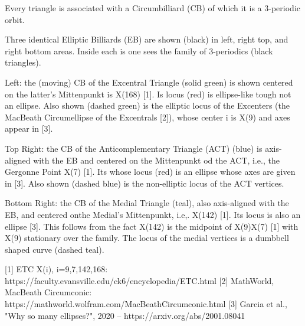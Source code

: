 Every triangle is associated with a Circumbilliard (CB) of which it is a 3-periodic orbit.

Three identical Elliptic Billiards (EB) are shown (black) in left, right top, and right bottom areas. Inside each is one sees the family of 3-periodics (black triangles).

Left: the (moving) CB of the Excentral Triangle (solid green) is shown centered on the latter's Mittenpunkt is X(168) [1]. Is locus (red) is ellipse-like tough not an ellipse. Also shown (dashed green) is the elliptic locus of the Excenters (the MacBeath Circumellipse of the Excentrals [2]), whose center i is X(9) and axes appear in [3].

Top Right: the CB of the Anticomplementary Triangle (ACT) (blue) is axis-aligned with the EB and centered on the Mittenpunkt od the ACT, i.e., the Gergonne Point X(7) [1]. Its whose locus (red) is an ellipse whose axes are given in [3]. Also shown (dashed blue) is the non-elliptic locus of the ACT vertices.

Bottom Right: the CB of the Medial Triangle (teal), also axis-aligned with the EB, and centered onthe Medial's Mittenpunkt, i.e,. X(142) [1]. Its locus is also an ellipse [3]. This follows from the fact X(142) is the midpoint of X(9)X(7) [1] with X(9) stationary over the family. The locus of the medial vertices is a dumbbell shaped curve (dashed teal).


[1] ETC X(i), i=9,7,142,168: https://faculty.evansville.edu/ck6/encyclopedia/ETC.html
[2] MathWorld, MacBeath Circumconic: https://mathworld.wolfram.com/MacBeathCircumconic.html 
[3] Garcia et al., "Why so many ellipses?", 2020 --  https://arxiv.org/abs/2001.08041